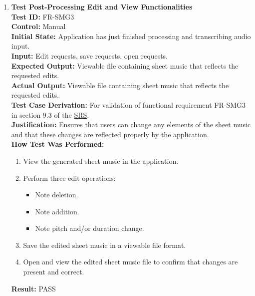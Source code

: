 \documentclass[12pt, titlepage]{article}
\begin{document}
\begin{enumerate}
  \item \textbf{Test Post-Processing Edit and View Functionalities} \\
    \newline
    \textbf{Test ID:} FR-SMG3 \\
    \textbf{Control:} Manual \\
    \textbf{Initial State:} Application has just finished processing and transcribing audio input. \\
    \textbf{Input:} Edit requests, save requests, open requests. \\
    \textbf{Expected Output:} Viewable file containing sheet music that reflects the requested edits. \\
    \textbf{Actual Output:} Viewable file containing sheet music that reflects the requested edits. \\
    \textbf{Test Case Derivation:} For validation of functional requirement FR-SMG3 in section 9.3 of the 
    \href{https://github.com/emilyperica/ScoreGen/blob/main/docs/SRS-Volere/SRS.pdf}{SRS}. \\
    \textbf{Justification:} Ensures that users can change any elements of the sheet music and that these 
    changes are reflected properly by the application.\\ 
    \textbf{How Test Was Performed:}
    \begin{enumerate}
        \item View the generated sheet music in the application.
        \item Perform three edit operations:
        \begin{itemize}
            \item Note deletion.
            \item Note addition.
            \item Note pitch and/or duration change.
        \end{itemize}
        \item Save the edited sheet music in a viewable file format.
        \item Open and view the edited sheet music file to confirm that changes are present and correct.
    \end{enumerate}
    \textbf{Result:} PASS
  \end{enumerate}
  
\end{document}
